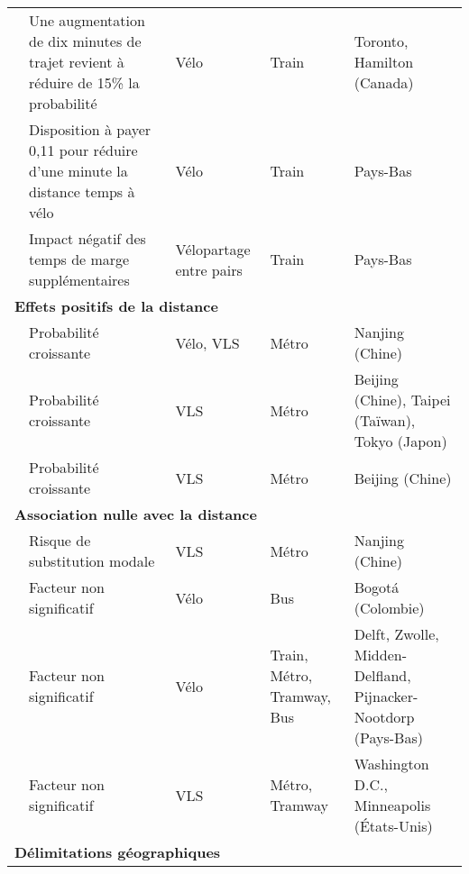 \begin{longtable}{p{3cm}p{4cm}p{1.5cm}p{1.8cm}p{2.3cm}}
    \small{\textcite{chan_factors_2020}}\index{Chan, Kevin|pagebf} & \small{Une augmentation de dix minutes de trajet revient à réduire de 15\% la probabilité} & \small{Vélo} & \small{Train} & \small{Toronto, Hamilton (Canada)}\\
    \small{\textcite{van_mil_insights_2020}}\index{van Mil, Joeri F.P.|pagebf} & \small{Disposition à payer 0,11\€ pour réduire d'une minute la distance temps à vélo} & \small{Vélo} & \small{Train} & \small{Pays-Bas}\\
    \small{\textcite{van_goeverden_potential_2018}}\index{van Goeverden, Kees|pagebf} & \small{Impact négatif des temps de marge supplémentaires} & \small{Vélopartage entre pairs} & \small{Train} & \small{Pays-Bas}\\
    \hline
\multicolumn{5}{l}{\textbf{Effets positifs de la distance}}\\
    \small{\textcite{ji_public_2017}}\index{Ji, Yanjie|pagebf} & \small{Probabilité croissante} & \small{Vélo, VLS} & \small{Métro} & \small{Nanjing (Chine)}\\
    \small{\textcite{lin_built_2018}}\index{Lin, Jen-Jia|pagebf} & \small{Probabilité croissante} & \small{VLS} & \small{Métro} & \small{Beijing (Chine), Taipei (Taïwan), Tokyo (Japon)}\\
    \small{\textcite{zhao_public_2022}}\index{Zhao, Pengjun|pagebf} & \small{Probabilité croissante} & \small{VLS} & \small{Métro} & \small{Beijing (Chine)}\\
    \hline
\multicolumn{5}{l}{\textbf{Association nulle avec la distance}}\\
    \small{\textcite{ji_exploring_2018}}\index{Ji, Yanjie|pagebf} & \small{Risque de substitution modale} & \small{VLS} & \small{Métro} & \small{Nanjing (Chine)}\\
    \small{\textcite{cervero_influences_2009}}\index{Cervero, Robert|pagebf} & \small{Facteur non significatif} & \small{Vélo} & \small{Bus} & \small{Bogotá (Colombie)}\\
    \small{\textcite{heinen_multimodal_2014}}\index{Heinen, Eva|pagebf} & \small{Facteur non significatif} & \small{Vélo} & \small{Train, Métro, Tramway, Bus} & \small{Delft, Zwolle, Midden-Delfland, Pijnacker-Nootdorp (Pays-Bas)}\\
    \small{\textcite{martin_evaluating_2014}}\index{Martin, Elliot W.|pagebf} & \small{Facteur non significatif} & \small{VLS} & \small{Métro, Tramway} & \small{Washington D.C., Minneapolis (États-Unis)}\\
    \hline
\multicolumn{5}{l}{\textbf{Délimitations géographiques}}\\

\end{longtable}
